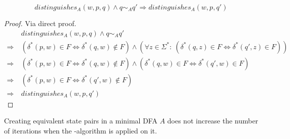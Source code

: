 \begin{lemma}\label{ch:3:lem:disting-trans}
    \[
    distinguishes_A(w, p, q) \land q \sim_A q' \Rightarrow distinguishes_A(w, p, q')
    \]
\end{lemma}

\begin{proof}
    Via direct proof.
    \begin{align*}
        &\ distinguishes_A(w, p, q) \land q \sim_A q' \\
        \Rightarrow &\ (\delta^*(p,w) \in F \Leftrightarrow \delta^*(q,w) \notin F) \land (\forall z \in \Sigma^* \colon\ (\delta^*(q, z) \in F \Leftrightarrow \delta^*(q', z) \in F)) \\
        \Rightarrow &\ (\delta^*(p,w) \in F \Leftrightarrow \delta^*(q,w) \notin F) \land (\delta^*(q, w) \in F \Leftrightarrow \delta^*(q', w) \in F) \\
        \Rightarrow &\ (\delta^*(p,w) \in F \Leftrightarrow \delta^*(q',w) \notin F) \\
        \Rightarrow &\ distinguishes_A(w, p, q')
    \end{align*}
\end{proof}

\begin{theorem}
	Creating equivalent state pairs in a minimal DFA $A$ does not increase the number of iterations when the \CompDist-algorithm is applied on it.
\end{theorem}


